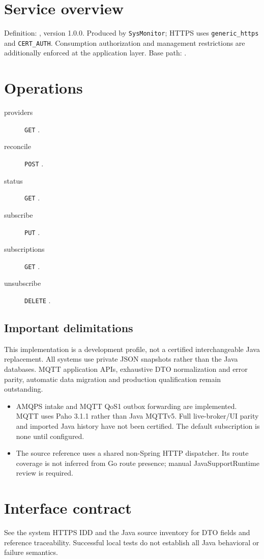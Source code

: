 \documentclass[a4paper]{arrowhead}
\begin{document}
\ArrowheadSetup
\section{Service overview}
Definition: , version 1.0.0. Produced by \texttt{SysMonitor}; HTTPS uses \texttt{generic\_https} and \texttt{CERT\_AUTH}. Consumption authorization and management restrictions are additionally enforced at the application layer. Base path: .
\section{Operations}
\begin{description}
\item[providers] \texttt{GET} .
\item[reconcile] \texttt{POST} .
\item[status] \texttt{GET} .
\item[subscribe] \texttt{PUT} .
\item[subscriptions] \texttt{GET} .
\item[unsubscribe] \texttt{DELETE} .
\end{description}
\subsection{Important delimitations}
This implementation is a development profile, not a certified interchangeable Java replacement. All systems use private JSON snapshots rather than the Java databases. MQTT application APIs, exhaustive DTO normalization and error parity, automatic data migration and production qualification remain outstanding.
\begin{itemize}
\item AMQPS intake and MQTT QoS1 outbox forwarding are implemented. MQTT uses Paho 3.1.1 rather than Java MQTTv5. Full live-broker/UI parity and imported Java history have not been certified. The default subscription is none until configured.
\item The source reference uses a shared non-Spring HTTP dispatcher. Its route coverage is not inferred from Go route presence; manual JavaSupportRuntime review is required.
\end{itemize}
\section{Interface contract}
See the system HTTPS IDD and the Java source inventory for DTO fields and reference traceability. Successful local tests do not establish all Java behavioral or failure semantics.
\end{document}
